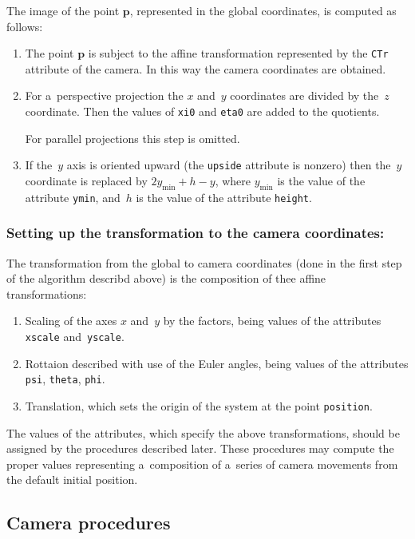 The image of the point $\bm{p}$, represented in the global coordinates, is
computed as follows:
\begin{enumerate}
  \item\begin{sloppypar}
    The point $\bm{p}$ is subject to the affine transformation represented
    by the \texttt{CTr} attribute of the camera. In this way the camera
    coordinates are obtained.%
    \end{sloppypar}
  \item For a~perspective projection the $x$ and~$y$ coordinates are divided
    by the~$z$ coordinate. Then the values of \texttt{xi0} and \texttt{eta0}
    are added to the quotients.

    For parallel projections this step is omitted.
  \item If the~$y$ axis is oriented upward (the \texttt{upside} attribute is
   nonzero) then the~$y$ coordinate is replaced by $2y_{\mathrm{min}}+h-y$,
   where $y_{\mathrm{min}}$ is the value of the attribute \texttt{ymin}, and~$h$
   is the value of the attribute \texttt{height}.
\end{enumerate}


\subsubsection*{Setting up the transformation to the camera coordinates:}

The transformation from the global to camera coordinates (done in the first
step of the algorithm describd above) is the composition of thee affine
transformations:
\begin{enumerate}
  \item Scaling of the axes $x$ and~$y$ by the factors, being values of the
    attributes \texttt{xscale} and~\texttt{yscale}.
  \item Rottaion described with use of the Euler angles, being values of the
    attributes \texttt{psi}, \texttt{theta}, \texttt{phi}.
  \item Translation, which sets the origin of the system at the point
    \texttt{position}.
\end{enumerate}
The values of the attributes, which specify the above transformations,
should be assigned by the procedures described later. These procedures
may compute the proper values representing a~composition of a~series of
camera movements from the default initial position.


\subsection{Camera procedures}

